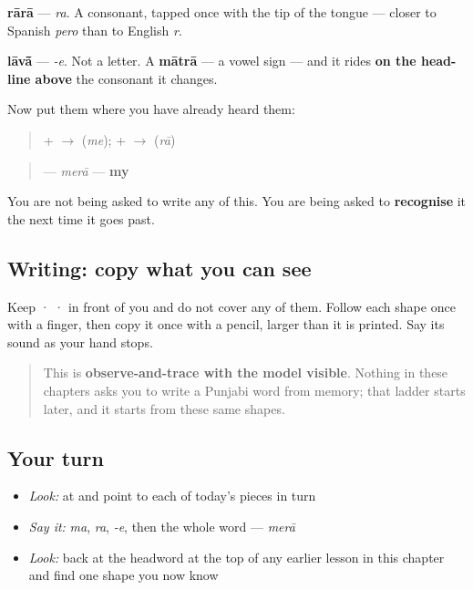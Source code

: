 \begin{quote}
\end{quote}

\textbf{rārā} — \emph{ra}. A consonant, tapped once with the tip of the tongue — closer to Spanish \emph{pero} than to English \emph{r}.

\begin{quote}
\end{quote}

\textbf{lāvā̃} — \emph{-e}. Not a letter. A \textbf{mātrā} — a vowel sign — and it rides \textbf{on the head-line above} the consonant it changes.

Now put them where you have already heard them:

\begin{quote}
\textbf{} + \textbf{} $\to$ \textbf{} (\emph{me});  \textbf{} + \textbf{} $\to$ \textbf{} (\emph{rā})
\end{quote}

\begin{quote}
\textbf{} — \emph{merā} — \textbf{my}
\end{quote}

You are not being asked to write any of this. You are being asked to \textbf{recognise} it the next time it goes past.

\subsection*{Writing: copy what you can see}
Keep  ·  ·  in front of you and do not cover any of them. Follow each shape once with a finger, then copy it once with a pencil, larger than it is printed. Say its sound as your hand stops.

\begin{quote}
This is \textbf{observe-and-trace with the model visible}. Nothing in these chapters asks you to write a Punjabi word from memory; that ladder starts later, and it starts from these same shapes.
\end{quote}

\subsection*{Your turn}
\begin{itemize}
\raggedright
  \item \emph{Look:} at \textbf{} and point to each of today's pieces in turn
  \item \emph{Say it:} \emph{ma}, \emph{ra}, \emph{-e}, then the whole word — \emph{merā}
  \item \emph{Look:} back at the headword at the top of any earlier lesson in this chapter and find one shape you now know
\end{itemize}

